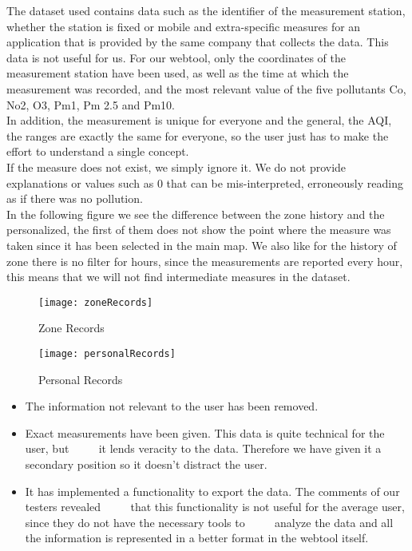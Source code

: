 The dataset used contains data such as the identifier of the measurement station, whether the station is fixed or mobile
and extra-specific measures for an application that is provided by the same company that collects the data. This data is not useful for us.
For our webtool, only the coordinates of the measurement station have been used, as well as the time at which the measurement was recorded, and the most relevant value of the five pollutants Co, No2, O3, Pm1, Pm 2.5 and Pm10.\\

In addition, the measurement is unique for everyone and the general, the AQI, the ranges are exactly the same for everyone, so the user just has to make the effort to understand a single concept.\\

If the measure does not exist, we simply ignore it. We do not provide explanations or values such as 0 that can be mis-interpreted, erroneously reading as if there was no pollution.\\

In the following figure we see the difference between the zone history and the personalized, the first of them does not show
the point where the measure was taken since it has been selected in the main map. We also like for the history of
zone there is no filter for hours, since the measurements are reported every hour, this means that we will not find
intermediate measures in the dataset.\\

\begin{figure}[ht]
    \centering
    \texttt{[image: zoneRecords]}
    \caption{Zone Records}
\end{figure}

\begin{figure}[ht]
    \centering
    \texttt{[image: personalRecords]}
    \caption{Personal Records}
\end{figure}

\begin{itemize}
    \item The information not relevant to the user has been removed.
    \item Exact measurements have been given. This data is quite technical for the user, but 
          it lends veracity to the data. Therefore we have given it a secondary position so it doesn't distract the user.
    \item It has implemented a functionality to export the data. The comments of our testers revealed
          that this functionality is not useful for the average user, since they do not have the necessary tools to
          analyze the data and all the information is represented in a better format in the webtool itself.
\end{itemize}